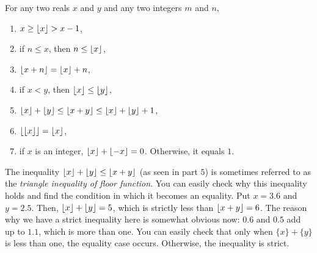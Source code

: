 \begin{proposition} \label{prop:floor}
For any two reals $x$ and $y$ and any two integers $m$ and $n$,
\begin{enumerate}[1.]
	\item $x\geq\left\lfloor{x}\right\rfloor>x-1$,
	\item if $n \leq x$, then $n \leq \left\lfloor{x}\right\rfloor$,
	\item $\left\lfloor{x+n}\right\rfloor=\left\lfloor{x}\right\rfloor+n$,
	\item if $x <y$, then $\left\lfloor{x}\right\rfloor\leq \left\lfloor{y}\right\rfloor$,
	\item $\left\lfloor{x}\right\rfloor+\left\lfloor{y}\right\rfloor\leq \left\lfloor{x+y}\right\rfloor\leq \left\lfloor{x}\right\rfloor+\left\lfloor{y}\right\rfloor+1$,
	\item $\left\lfloor{\left\lfloor{x}\right\rfloor}\right\rfloor =  \left\lfloor{x}\right\rfloor$,
	\item if $x$ is an integer, $\left\lfloor{x}\right\rfloor+\left\lfloor{-x}\right\rfloor=0$. Otherwise, it equals $1$.
\end{enumerate}
\end{proposition}

\begin{example}
The inequality $\left\lfloor{x}\right\rfloor+\left\lfloor{y}\right\rfloor\leq \left\lfloor{x+y}\right\rfloor$ (as seen in part $5$) is sometimes referred to as the \textit{triangle inequality of floor function}. You can easily check why this inequality holds and find the condition in which it becomes an equality. Put $x=3.6$ and $y=2.5$. Then, $\left\lfloor{x}\right\rfloor+\left\lfloor{y}\right\rfloor= 5$, which is strictly less than $\left\lfloor{x+y}\right\rfloor=6$. The reason why we have a strict inequality here is somewhat obvious now: $0.6$ and $0.5$ add up to $1.1$, which is more than one. You can easily check that only when $\{x\} + \{y\}$ is less than one, the equality case occurs. Otherwise, the inequality is strict.
\end{example}

